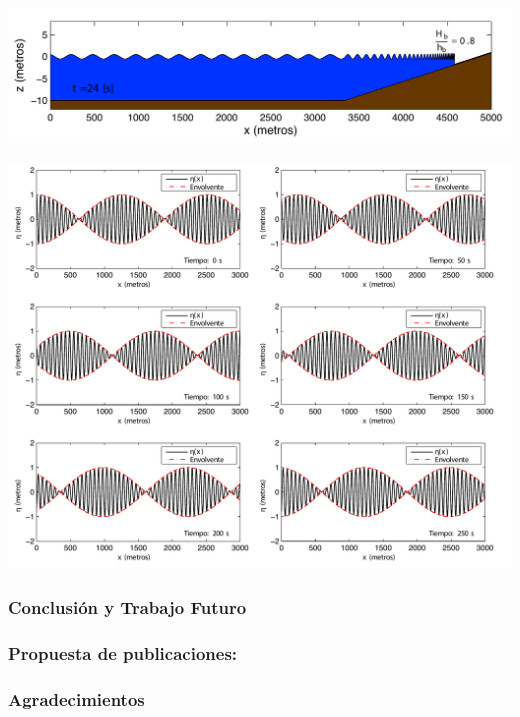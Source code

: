 \documentclass[11pt,letterpaper]{article}
\begin{document}
\begin{tcolorbox}[breakable]
\lipsum[29-31]

{\centering
\includegraphics[scale=0.95]{figs/fig_3.pdf}
\vspace{-3.5mm}
}
\vspace{3.5mm}

\lipsum[22-35]

{\centering
\includegraphics[scale=0.75]{figs/fig_4.pdf}
\vspace{-5mm}
}
\vspace{3.5mm}

\lipsum[36]

\subsubsection{Conclusión y Trabajo Futuro} \label{sec:sec5}

\lipsum[37-39]

\subsubsection*{Propuesta de publicaciones:}

\blindenumerate[3]

\subsubsection*{Agradecimientos} 

\lipsum[40]


\nocite{*}
\renewcommand{\bibname}{Referencias}

%

\end{tcolorbox}
\end{document}
